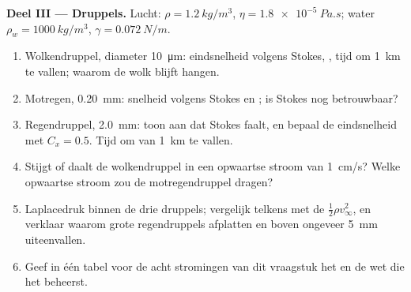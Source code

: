 \begin{problem}
\medskip
\noindent\textbf{Deel III --- Druppels.}
Lucht: $\rho = \qty{1.2}{kg/m^3}$, $\eta = \qty{1.8e-5}{Pa.s}$; water
$\rho_w =
\qty{1000}{kg/m^3}$, $\gamma = \qty{0.072}{N/m}$.
\begin{enumerate}[resume]
  \item Wolkendruppel, diameter \qty{10}{\micro m}: eindsnelheid volgens
        Stokes, , tijd om \qty{1}{km} te vallen; waarom de wolk
        blijft hangen.
  \item Motregen, \qty{0.20}{mm}: snelheid volgens Stokes en ;
        is Stokes nog betrouwbaar?
  \item Regendruppel, \qty{2.0}{mm}: toon aan dat Stokes faalt, en bepaal de
        eindsnelheid met $C_x = 0.5$. Tijd om van \qty{1}{km} te vallen.
  \item Stijgt of daalt de wolkendruppel in een opwaartse stroom van
        \qty{1}{cm/s}? Welke opwaartse stroom zou de motregendruppel dragen?
  \item Laplacedruk binnen de drie druppels; vergelijk telkens met de
         $\tfrac12\rho v_\infty^2$, en verklaar waarom grote
        regendruppels afplatten en boven ongeveer \qty{5}{mm} uiteenvallen.
  \item Geef in één tabel voor de acht stromingen van dit vraagstuk het
         en de wet die het beheerst.
\end{enumerate}
\end{problem}
